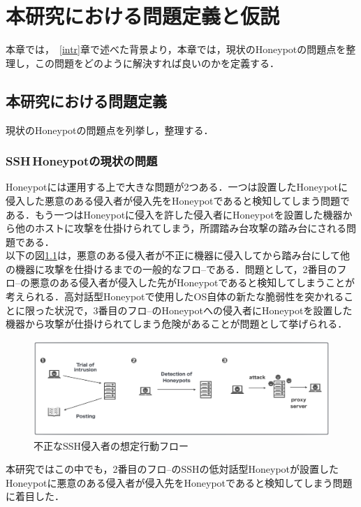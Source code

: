 \chapter{本研究における問題定義と仮説}
\label{appr}

本章では，~\ref{intr}章で述べた背景より，本章では，現状のHoneypotの問題点を整理し，この問題をどのように解決すれば良いのかを定義する．

\section{本研究における問題定義}
\label{appr:problem}
現状のHoneypotの問題点を列挙し，整理する．

\subsection{SSH\,Honeypotの現状の問題}
\label{appr:problemofSshHoneypot}
Honeypotには運用する上で大きな問題が2つある．一つは設置したHoneypotに侵入した悪意のある侵入者が侵入先をHoneypotであると検知してしまう問題である．もう一つはHoneypotに侵入を許した侵入者にHoneypotを設置した機器から他のホストに攻撃を仕掛けられてしまう，所謂踏み台攻撃の踏み台にされる問題である．\\
以下の図\ref{fig:flow}は，悪意のある侵入者が不正に機器に侵入してから踏み台にして他の機器に攻撃を仕掛けるまでの一般的なフロ--である．問題として，2番目のフロ--の悪意のある侵入者が侵入した先がHoneypotであると検知してしまうことが考えられる．高対話型Honeypotで使用したOS自体の新たな脆弱性を突かれることに限った状況で，3番目のフロ--のHoneypotへの侵入者にHoneypotを設置した機器から攻撃が仕掛けられてしまう危険があることが問題として挙げられる．

\vspace{10mm}
\begin{figure}[htbp]
    \centering
    \includegraphics[width=1.0\textwidth]{figures/nagare.png}
    \caption{不正なSSH侵入者の想定行動フロー}
    \label{fig:flow}
\end{figure}

本研究ではこの中でも，2番目のフロ--のSSHの低対話型Honeypotが設置したHoneypotに悪意のある侵入者が侵入先をHoneypotであると検知してしまう問題に着目した．

